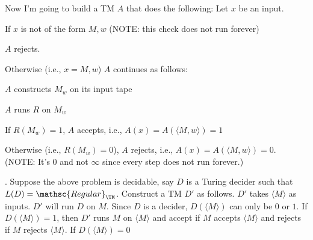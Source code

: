 Now I'm going to build a TM $A$ that does the following:
Let $x$ be an input.
\begin{tightlist}
\item If $x$ is not of the form $M,w$ (NOTE: this check does not run
  forever)
  \begin{tightlist}
  \item $A$ rejects.
  \end{tightlist}
\item Otherwise (i.e., $x = M,w$) $A$ continues as follows:
  \begin{tightlist}
  \item $A$ constructs $M_w$ on its input tape
  \item $A$ runs $R$ on $M_w$
  \item If $R(M_w) = 1$, $A$ accepts, i.e., $A(x) = A(\langle M, w\rangle) = 1$
  \item Otherwise (i.e., $R(M_w) = 0$), $A$ rejects, i.e.,
    $A(x) = A(\langle M, w\rangle) = 0$.
    (NOTE: It's $0$ and not $\infty$ since
    every step does not run forever.)
  \end{tightlist}
\end{tightlist}





\SOLUTION.
Suppose the above problem is decidable,
say $D$ is a Turing decider such that $L(D) = \mathsc{Regular}_\TM$.
Construct a TM $D'$ as follows. $D'$ takes $\langle M \rangle$ as inputs.
$D'$ will run $D$ on $M$.
Since $D$ is a decider, $D(\langle M \rangle)$ can only be $0$ or $1$.
If $D(\langle M \rangle) = 1$, then $D'$ runs $M$ on $\langle M \rangle$
and accept if $M$ accepts $\langle M \rangle$
and rejects if $M$ rejects $\langle M \rangle$.
If $D(\langle M \rangle) = 0$

